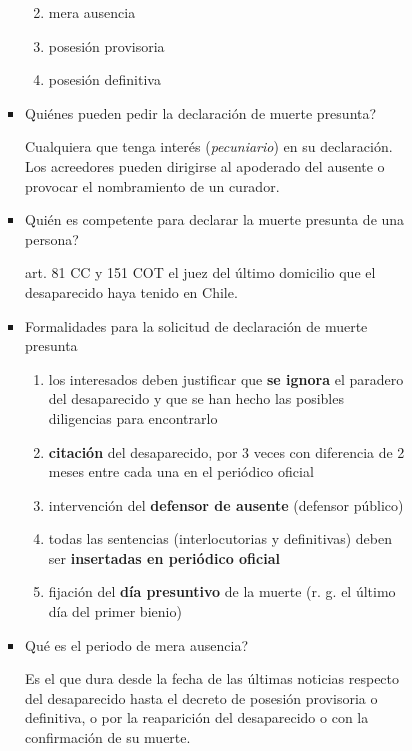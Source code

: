 \documentclass[]{article}
\providecommand{\tightlist}{%
  \setlength{\itemsep}{0pt}\setlength{\parskip}{0pt}}
\begin{document}
\begin{itemize}
\begin{itemize}
\begin{itemize}
\begin{itemize}
\begin{itemize}
          \begin{enumerate}
          \def\labelenumi{\arabic{enumi}.}
          \tightlist
          \item
            mera ausencia
          \item
            posesión provisoria
          \item
            posesión definitiva
          \end{enumerate}
        \item
          Quiénes pueden pedir la declaración de muerte presunta?

          Cualquiera que tenga interés (\emph{pecuniario}) en su
          declaración. Los acreedores pueden dirigirse al apoderado del
          ausente o provocar el nombramiento de un curador.
        \item
          Quién es competente para declarar la muerte presunta de una
          persona?

          art. 81 CC y 151 COT el juez del último domicilio que el
          desaparecido haya tenido en Chile.
        \item
          Formalidades para la solicitud de declaración de muerte
          presunta

          \begin{enumerate}
          \def\labelenumi{\arabic{enumi}.}
          \tightlist
          \item
            los interesados deben justificar que \textbf{se ignora} el
            paradero del desaparecido y que se han hecho las posibles
            diligencias para encontrarlo
          \item
            \textbf{citación} del desaparecido, por 3 veces con
            diferencia de 2 meses entre cada una en el periódico oficial
          \item
            intervención del \textbf{defensor de ausente} (defensor
            público)
          \item
            todas las sentencias (interlocutorias y definitivas) deben
            ser \textbf{insertadas en periódico oficial}
          \item
            fijación del \textbf{día presuntivo} de la muerte (r. g. el
            último día del primer bienio)
          \end{enumerate}
        \item
          Qué es el periodo de mera ausencia?

          Es el que dura desde la fecha de las últimas noticias respecto
          del desaparecido hasta el decreto de posesión provisoria o
          definitiva, o por la reaparición del desaparecido o con la
          confirmación de su muerte.


\end{itemize}
\end{itemize}
\end{itemize}
\end{itemize}
\end{itemize}
\end{document}

